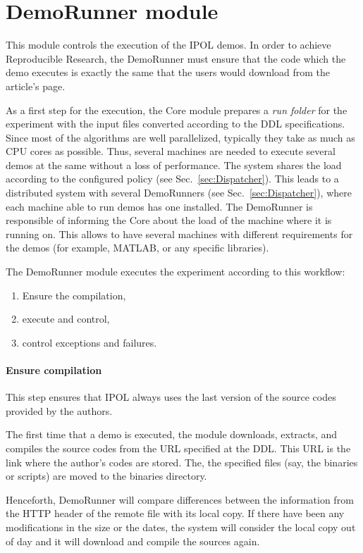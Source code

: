 \section{DemoRunner module}
\label{sec:DemoRunner}
This module controls the execution of the IPOL demos. In order to achieve Reproducible Research, the DemoRunner must ensure that the code which the demo executes is exactly the same that the users would download from the article's page.

As a first step for the execution, the Core module prepares a \emph{run folder} for the experiment with the input files converted according to the DDL specifications. Since most of the algorithms are well parallelized, typically they take as much as CPU cores as possible. Thus, several machines are needed to execute several demos at the same without a loss of performance. The system shares the load according to the configured policy (see Sec.~\ref{sec:Dispatcher}). This leads to a distributed system with several DemoRunners (see Sec.~\ref{sec:Dispatcher}), where each machine able to run demos has one installed. The DemoRunner is responsible of informing the Core about the load of the machine where it is running on. This allows to have several machines with different requirements for the demos (for example, MATLAB, or any specific libraries).

The DemoRunner module executes the experiment according to this workflow:

\begin{enumerate}
    \item Ensure the compilation,
    \item execute and control,
    \item control exceptions and failures. 
\end{enumerate}

\paragraph{Ensure compilation}
\noindent

This step ensures that IPOL always uses the last version of the source codes provided by the authors. 

The first time that a demo is executed, the module downloads, extracts, and compiles the source codes from the URL specified at the DDL. This URL is the link where the author's codes are stored. The, the specified files (say, the binaries or scripts) are moved to the binaries directory.

Henceforth, DemoRunner will compare differences between the information from the HTTP header of the remote file with its local copy. If there have been any modifications in the size or the dates, the system will consider the local copy out of day and it will download and compile the sources again. 

